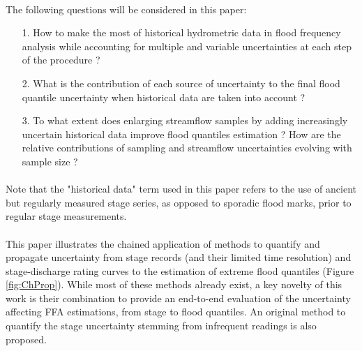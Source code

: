 \documentclass[11pt]{article}
\begin{document}
    \paragraph{}
    The following questions will be considered in this paper: 
    \begin{itemize}
        \item[1.] How to make the most of historical hydrometric data in flood frequency analysis while accounting for multiple and variable uncertainties at each step of the procedure ? 
        
        \item[2.] What is the contribution of each source of uncertainty to the final flood quantile uncertainty when historical data are taken into account ? 
        
        \item[3.] To what extent does enlarging streamflow samples by adding increasingly uncertain historical data improve flood quantiles estimation ? How are the relative contributions of sampling and streamflow uncertainties evolving with sample size ?
    \end{itemize}

    \paragraph{}
    Note that the "historical data" term used in this paper refers to the use of ancient but regularly measured stage series, as opposed to sporadic flood marks, prior to regular stage measurements. 
    \paragraph{}
    This paper illustrates the chained application of methods to quantify and propagate uncertainty from stage records (and their limited time resolution) and stage-discharge rating curves to the estimation of extreme flood quantiles (Figure \ref{fig:ChProp}). While most of these methods already exist, a key novelty of this work is their combination to provide an end-to-end evaluation of the  uncertainty affecting FFA estimations, from stage to flood quantiles. An original method to quantify the stage uncertainty stemming from infrequent readings is also proposed.
\end{document}
